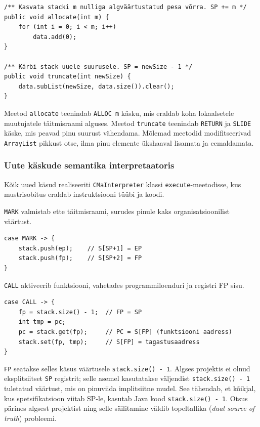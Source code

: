 \begin{verbatim}
/** Kasvata stacki m nulliga algväärtustatud pesa võrra. SP += m */
public void allocate(int m) {
    for (int i = 0; i < m; i++)
        data.add(0);
}

/** Kärbi stack uuele suurusele. SP = newSize - 1 */
public void truncate(int newSize) {
    data.subList(newSize, data.size()).clear();
}
\end{verbatim}

Meetod \texttt{allocate} teenindab \texttt{ALLOC m} käsku, mis eraldab koha lokaalsetele muutujatele täitmisraami alguses. Meetod \texttt{truncate} teenindab \texttt{RETURN} ja \texttt{SLIDE} käske, mis peavad pinu suurust vähendama. Mõlemad meetodid modifitseerivad \texttt{ArrayList} pikkust otse, ilma pinu elemente ükshaaval lisamata ja eemaldamata.

\subsubsection{Uute käskude semantika interpretaatoris}

Kõik uued käsud realiseeriti \texttt{CMaInterpreter} klassi \texttt{execute}-meetodisse, kus mustrisobitus eraldab instruktsiooni tüübi ja koodi.

\texttt{MARK} valmistab ette täitmisraami, surudes pinule kaks organisatsioonilist väärtust.
\begin{verbatim}
case MARK -> {
    stack.push(ep);    // S[SP+1] = EP
    stack.push(fp);    // S[SP+2] = FP
}
\end{verbatim}

\texttt{CALL} aktiveerib funktsiooni, vahetades programmiloenduri ja registri FP sisu.
\begin{verbatim}
case CALL -> {
    fp = stack.size() - 1;  // FP = SP
    int tmp = pc;
    pc = stack.get(fp);     // PC = S[FP] (funktsiooni aadress)
    stack.set(fp, tmp);     // S[FP] = tagastusaadress
}
\end{verbatim}

\texttt{FP} seatakse selles käsus väärtusele \texttt{stack.size() - 1}. Algses projektis ei olnud eksplitsiitset \texttt{SP} registrit; selle asemel kasutatakse väljendist \texttt{stack.size() - 1} tuletatud väärtust, mis on pinuviida implitsiitne mudel. See tähendab, et kõikjal, kus spetsifikatsioon viitab $\text{SP}$-le, kasutab Java kood \texttt{stack.size() - 1}. Otsus pärines algsest projektist ning selle säilitamine väldib topeltallika (\emph{dual source of truth}) probleemi.

